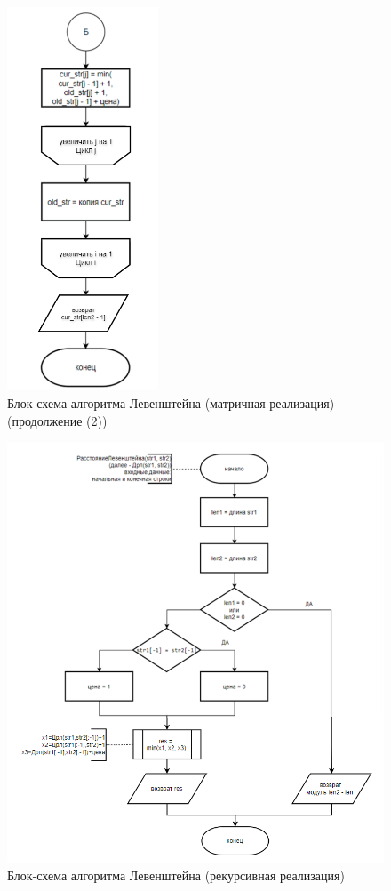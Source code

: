 \begin{figure}[H]
    \centering
    \includegraphics[width=0.4\textwidth]{img/block_1_1_3.png}
    \caption{Блок-схема алгоритма Левенштейна (матричная реализация) (продолжение (2))}
    \label{fig:block_1_1_3}
\end{figure}

\begin{figure}[H]
    \centering
    \includegraphics[width=1.1\textwidth]{img/block_1_2.png}
    \caption{Блок-схема алгоритма Левенштейна (рекурсивная реализация)}
    \label{fig:block_1_2}
\end{figure}

